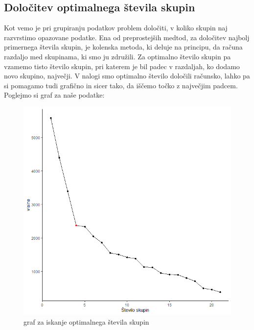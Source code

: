 \documentclass[12pt,a4paper]{article}
\begin{document}
\subsection{Določitev optimalnega števila skupin}
Kot vemo je pri grupiranju podatkov problem določiti, v koliko skupin naj razvrstimo opazovane podatke.
Ena od preprostejših medtod, za določitev najbolj primernega števila skupin, je
kolenska metoda, ki deluje na principu, da računa razdaljo med skupinama, ki smo ju združili.
Za optimalno število skupin pa vzamemo tisto število skupin, pri katerem je bil padec v razdaljah, ko 
dodamo novo skupino, največji. V nalogi smo optimalno število določili računsko, lahko pa si pomagamo
tudi grafično in sicer tako, da iščemo točko z največjim padcem. \\
Poglejmo si graf za naše podatke:\\
\begin{figure}[h!]
    \centering
    \includegraphics[width=1.0\linewidth,height=0.5\textheight]{slike/kolena.png}
    \caption{graf za iskanje optimalnega števila skupin}
\end{figure}
\end{document}
